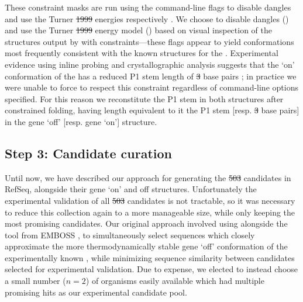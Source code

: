 \documentclass[11pt, oneside]{Thesis} %
\providecommand{\DIFadd}[1]{{\protect\color{blue}\uwave{#1}}} %
\providecommand{\DIFdel}[1]{{\protect\color{red}\sout{#1}}}                      %
\providecommand{\DIFaddbegin}{} %
\providecommand{\DIFaddend}{} %
\providecommand{\DIFdelbegin}{} %
\providecommand{\DIFdelend}{} %
\begin{document}
These constraint masks are run using the command-line flags
 to disable dangles and use the Turner \DIFdelbegin \DIFdel{1999
}\DIFdelend \DIFaddbegin \DIFadd{$1999$
}\DIFaddend energies respectively \citep{mathews:1999jw}. We choose to disable dangles () and use
the Turner \DIFdelbegin \DIFdel{1999 }\DIFdelend \DIFaddbegin \DIFadd{$1999$ }\DIFaddend energy model ()
based on visual inspection of the structures output by \rfold with
constraints---these flags appear to yield conformations most frequently consistent
with the known structures for the \Bsxpt \grb.
Experimental evidence using inline probing and
crystallographic analysis suggests that
the `on' conformation of the \grb has a reduced P1 stem length of \DIFdelbegin \DIFdel{3 }\DIFdelend \DIFaddbegin \DIFadd{$3$ }\DIFaddend base pairs
\citep{mandalboesebarrickwinklerbreaker,serganov:2004dq};
in practice we were unable to force \rfold to respect this constraint regardless
of command-line options specified. For this reason we reconstitute the P1 stem in
both structures after constrained folding, having length equivalent to it the
\infernal P1 stem [resp. \DIFdelbegin \DIFdel{3 }\DIFdelend \DIFaddbegin \DIFadd{$3$ }\DIFaddend base pairs] in the gene `off' [resp. gene `on']
structure.

\subsection{Step 3: Candidate curation}
\label{subsec:rfinder:curation}

Until now, we have described our approach for generating the \DIFdelbegin \DIFdel{503 }\DIFdelend \DIFaddbegin \DIFadd{$503$ }\DIFaddend \grb candidates
in RefSeq, alongside their gene `on' and off structures. Unfortunately the
experimental validation of all \DIFdelbegin \DIFdel{503 }\DIFdelend \DIFaddbegin \DIFadd{$503$ }\DIFaddend candidates is not tractable, so it was
necessary to reduce this collection again to a more manageable size, while only
keeping the most promising candidates. Our original approach involved using
\foldalign \citep{gorodkin:1997tr,havgaard:2007ca} alongside the  tool from EMBOSS
\citep{rice:2000wr}, to simultaneously
select sequences which closely approximate the more thermodynamically stable
gene `off' conformation of the experimentally known \Bsxpt \grb, while minimizing
sequence similarity between candidates selected for experimental validation. Due to
expense, we elected to instead choose a small number
($n = 2$) of organisms easily available which had multiple promising hits as our
experimental candidate pool.
\end{document}
